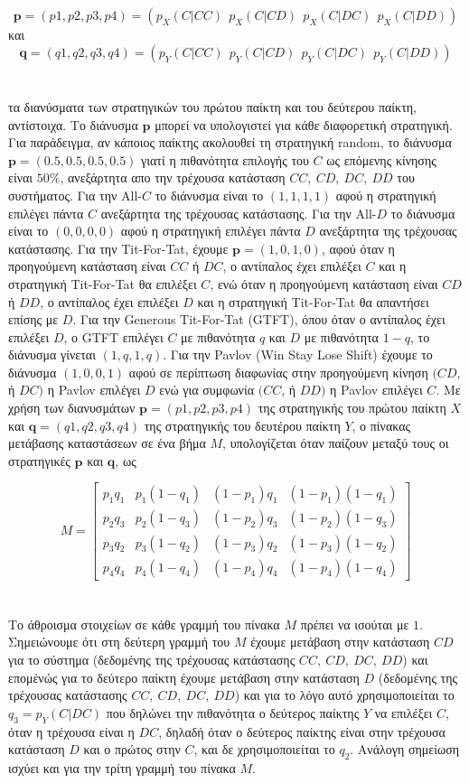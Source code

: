 \documentclass{article}
\begin{document}
\\\\
$$\mathbf{p}=(p1, p2, p3, p4)=(p_X(C|CC)\ \ p_X(C|CD)\ \ p_X(C|DC)\ \ p_X(C|DD))$$ και
$$\mathbf{q}=(q1, q2, q3, q4)=(p_Y(C|CC)\ \ p_Y(C|CD)\ \ p_Y(C|DC)\ \ p_Y(C|DD))$$
\\\\
τα διανύσματα των στρατηγικών του πρώτου παίκτη και του δεύτερου παίκτη, αντίστοιχα. Το διάνυσμα  $\mathbf{p}$ μπορεί να υπολογιστεί για κάθε διαφορετική στρατηγική. Για παράδειγμα, αν κάποιος παίκτης ακολουθεί τη στρατηγική random, το διάνυσμα $\mathbf{p}=(0.5, 0.5, 0.5, 0.5)$ γιατί η πιθανότητα επιλογής του $C$ ως επόμενης κίνησης είναι $50\%$, ανεξάρτητα απο την τρέχουσα κατάσταση $CC,\ CD,\ DC,\ DD$ του συστήματος. Για την $\text{All-}C$ το διάνυσμα είναι το $(1, 1, 1, 1)$ αφού η στρατηγική επιλέγει πάντα $C$ ανεξάρτητα της τρέχουσας κατάστασης. Για την $\text{All-}D$ το διάνυσμα είναι το $(0, 0, 0, 0)$ αφού η στρατηγική επιλέγει πάντα $D$ ανεξάρτητα της τρέχουσας κατάστασης. Για την Tit-For-Tat, έχουμε $\mathbf{p}=(1, 0, 1, 0)$, αφού όταν η προηγούμενη κατάσταση είναι $CC$ ή $DC$, ο αντίπαλος έχει επιλέξει $C$ και η στρατηγική Tit-For-Tat θα επιλέξει $C$, ενώ όταν η προηγούμενη κατάσταση είναι  $CD$ ή $DD$, ο αντίπαλος έχει επιλέξει $D$ και η στρατηγική Tit-For-Tat θα απαντήσει επίσης με $D$. Για την Generous Tit-For-Tat (GTFT), όπου όταν ο αντίπαλος έχει επιλέξει $D$, ο GTFT επιλέγει $C$ με πιθανότητα $q$ και $D$ με πιθανότητα $1-q$, το διάνυσμα γίνεται $(1, q, 1, q)$. Για την Pavlov (Win Stay Lose Shift) έχουμε το διάνυσμα $(1, 0, 0, 1)$ αφού σε περίπτωση διαφωνίας στην προηγούμενη κίνηση $(CD$, ή $DC)$ η Pavlov επιλέγει $D$ ενώ για συμφωνία  $(CC$, ή $DD)$ η Pavlov επιλέγει $C$. Με χρήση των διανυσμάτων $\mathbf{p}=(p1, p2, p3, p4)$ της στρατηγικής του πρώτου παίκτη $X$ και $\mathbf{q}=(q1, q2, q3, q4)$ της στρατηγικής του δευτέρου παίκτη $Y$, ο πίνακας μετάβασης καταστάσεων σε ένα βήμα $M$, υπολογίζεται όταν παίζουν μεταξύ τους οι στρατηγικές $\mathbf{p}$ και $\mathbf{q}$, ως

\[M=
 \begin{bmatrix}
p_1q_1 & p_1(1-q_1) & (1-p_1)q_1 & (1-p_1)(1-q_1) \\
p_2q_3 & p_2(1-q_3) & (1-p_2)q_3 & (1-p_2)(1-q_3) \\
p_3q_2 & p_3(1-q_2) & (1-p_3)q_2 & (1-p_3)(1-q_2) \\
p_4q_4 & p_4(1-q_4) & (1-p_4)q_4 & (1-p_4)(1-q_4) 
\end{bmatrix}  \]
\\\\
Το άθροισμα στοιχείων σε κάθε γραμμή του πίνακα $M$ πρέπει να ισούται με $1$. Σημειώνουμε ότι στη δεύτερη γραμμή του $M$ έχουμε μετάβαση στην κατάσταση $CD$ για το σύστημα (δεδομένης της τρέχουσας κατάστασης $CC,\ CD,\ DC,\ DD$) και επομένώς για το δεύτερο παίκτη έχουμε μετάβαση στην κατάσταση $D$ (δεδομένης της τρέχουσας κατάστασης $CC,\ CD,\ DC,\ DD$) και για το λόγο αυτό χρησιμοποιείται το $q_3=p_Y(C|DC)$ που δηλώνει την πιθανότητα ο δεύτερος παίκτης $Y$ να επιλέξει $C$, όταν η τρέχουσα είναι η $DC$, δηλαδή όταν ο δεύτερος παίκτης είναι στην τρέχουσα κατάσταση $D$ και ο πρώτος στην $C$, και δε χρησιμοποιείται το $q_2$. Ανάλογη σημείωση ισχύει και για την τρίτη γραμμή του πίνακα $M$. 
\end{document}
